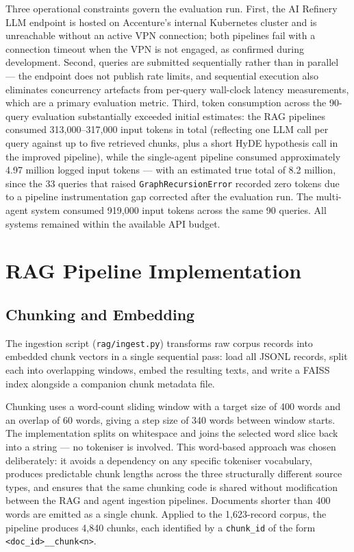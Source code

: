 Three operational constraints govern the evaluation run. First, the AI Refinery LLM endpoint is hosted on Accenture's internal Kubernetes cluster and is unreachable without an active VPN connection; both pipelines fail with a connection timeout when the VPN is not engaged, as confirmed during development. Second, queries are submitted sequentially rather than in parallel — the endpoint does not publish rate limits, and sequential execution also eliminates concurrency artefacts from per-query wall-clock latency measurements, which are a primary evaluation metric. Third, token consumption across the 90-query evaluation substantially exceeded initial estimates: the RAG pipelines consumed 313,000–317,000 input tokens in total (reflecting one LLM call per query against up to five retrieved chunks, plus a short HyDE hypothesis call in the improved pipeline), while the single-agent pipeline consumed approximately 4.97 million logged input tokens — with an estimated true total of 8.2 million, since the 33 queries that raised \texttt{GraphRecursionError} recorded zero tokens due to a pipeline instrumentation gap corrected after the evaluation run. The multi-agent system consumed 919,000 input tokens across the same 90 queries. All systems remained within the available API budget.

\section{RAG Pipeline Implementation}
\label{sec:rag-impl}

\subsection{Chunking and Embedding}

The ingestion script (\texttt{rag/ingest.py}) transforms raw corpus records into embedded chunk vectors in a single sequential pass: load all JSONL records, split each into overlapping windows, embed the resulting texts, and write a FAISS index alongside a companion chunk metadata file.

Chunking uses a word-count sliding window with a target size of 400 words and an overlap of 60 words, giving a step size of 340 words between window starts. The implementation splits on whitespace and joins the selected word slice back into a string — no tokeniser is involved. This word-based approach was chosen deliberately: it avoids a dependency on any specific tokeniser vocabulary, produces predictable chunk lengths across the three structurally different source types, and ensures that the same chunking code is shared without modification between the RAG and agent ingestion pipelines. Documents shorter than 400 words are emitted as a single chunk. Applied to the 1,623-record corpus, the pipeline produces 4,840 chunks, each identified by a \texttt{chunk\_id} of the form \texttt{<doc\_id>\_\_chunk<n>}.

